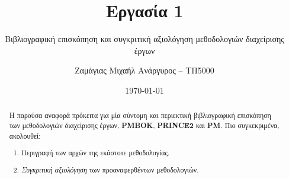 \documentclass[12pt]{turabian-researchpaper}
\title{Εργασία 1}
\subtitle{Βιβλιογραφική επισκόπηση και συγκριτική αξιολόγηση μεθοδολογιών διαχείρισης έργων}
\author{Ζαμάγιας Μιχαήλ Ανάργυρος -- ΤΠ5000}
\date{\today}
\begin{document}
\begin{titlepage}
    \maketitle
\end{titlepage}

\begin{abstract}
    Η παρούσα αναφορά πρόκειτα για μία σύντομη και περιεκτική βιβλιογραφική επισκόπηση των μεθοδολογιών διαχείρισης έργων, \textbf{PMBOK},
    \textbf{PRINCE2} και \textbf{PM}.
    Πιο συγκεκριμένα, ακολουθεί:
    \begin{enumerate}
        \item Περιγραφή των αρχών της εκάστοτε μεθοδολογίας.
        \item \textit{Συγκριτική αξιολόγηση} των προαναφερθέντων μεθοδολογιών.
    \end{enumerate}
\end{abstract}

\tableofcontents

\newpage
\end{document}
